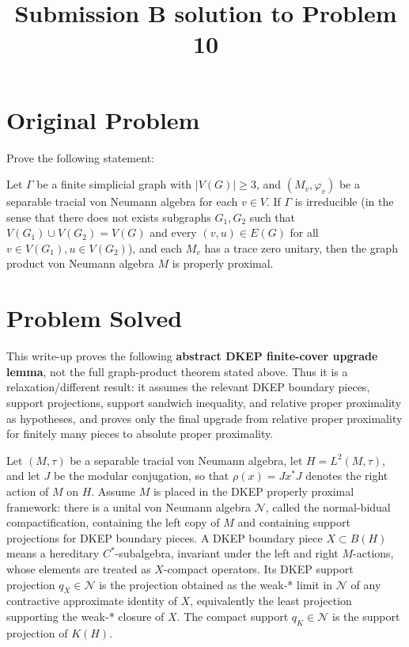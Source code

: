 \documentclass[12pt]{article}
\newcommand{\VV}{V}
\newcommand{\EE}{E}
\newcommand{\GG}{G}
\begin{document}
\title{Submission B solution to Problem 10}
\date{}
\maketitle

\section*{Original Problem}

Prove the following statement:

Let $\Gamma$ be a finite simplicial graph with $|\VV(\GG)|\geq 3$, and $(M_v,\varphi_v)$ be a separable tracial von Neumann algebra for each $v\in \VV$. If $\Gamma$ is irreducible (in the sense that there does not exists subgraphs $\GG_1,\GG_2$ such that $ \VV(\GG_1)\cup \VV(\GG_2)=\VV(\GG) $ and every $(v,u)\in \EE(\GG) $ for all $v\in\VV(\GG_1),u\in \VV(\GG_2)$), and each $M_v$ has a trace zero unitary, then the graph product von Neumann algebra $M$ is properly proximal.

\section*{Problem Solved}

This write-up proves the following \textbf{abstract DKEP finite-cover upgrade lemma}, not the full graph-product theorem stated above. Thus it is a relaxation/different result: it assumes the relevant DKEP boundary pieces, support projections, support sandwich inequality, and relative proper proximality as hypotheses, and proves only the final upgrade from relative proper proximality for finitely many pieces to absolute proper proximality.

Let \((M,\tau)\) be a separable tracial von Neumann algebra, let \(H=L^2(M,\tau)\), and let \(J\) be the modular conjugation, so that \(\rho(x)=Jx^*J\) denotes the right action of \(M\) on \(H\). Assume \(M\) is placed in the DKEP properly proximal framework: there is a unital von Neumann algebra \(\mathcal N\), called the normal-bidual compactification, containing the left copy of \(M\) and containing support projections for DKEP boundary pieces. A DKEP boundary piece \(X\subset B(H)\) means a hereditary \(C^*\)-subalgebra, invariant under the left and right \(M\)-actions, whose elements are treated as \(X\)-compact operators. Its DKEP support projection \(q_X\in\mathcal N\) is the projection obtained as the weak-* limit in \(\mathcal N\) of any contractive approximate identity of \(X\), equivalently the least projection supporting the weak-* closure of \(X\). The compact support \(q_K\in\mathcal N\) is the support projection of \(K(H)\).
\end{document}
